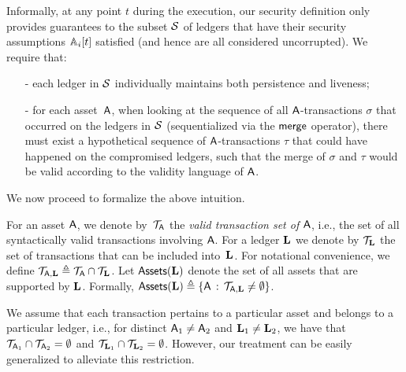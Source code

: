 Informally, at any point $t$ during the execution, our security definition only
provides guarantees to the  subset $\Secure$ of ledgers that have their security
assumptions $\Assum_i[t]$ satisfied (and hence are all considered uncorrupted). We
require that:
  \begin{itemize}
    \item[-] each ledger in $\Secure$ individually maintains both persistence and liveness;
    \item[-] for each asset~$\Asset$, when looking at the sequence of all
      $\Asset$-trans\-actions $\sigma$ that occurred on the ledgers in $\Secure$
      (sequentialized via the $\merge$ operator), there must exist a
      hypothetical sequence of $\Asset$-transactions $\tau$ that could have happened on the
      compromised ledgers, such that the merge of $\sigma$ and $\tau$ would be
      valid according to the validity language of $\Asset$.
  \end{itemize}
We now proceed to formalize the above intuition.

\begin{definition}
  For an asset $\Asset$, we denote by~$\Trans_{\Asset}$ the \emph{valid
  transaction set of $\Asset$}, i.e., the set of all syntactically
  valid transactions involving $\Asset$.
  For a ledger $\Ledger$ we denote by $\Trans_\Ledger$ the set of transactions
  that can be included into~$\Ledger$. For notational convenience, we define
  $\Trans_{\Asset,\Ledger}\defeq\Trans_{\Asset}\cap\Trans_\Ledger$.
  Let $\Assets(\Ledger)$  denote the set of all assets that are supported by
  $\Ledger$.
  Formally,
  $\Assets(\Ledger)
  \defeq
  \setd
    {\Asset}
    {\Trans_{\Asset,\Ledger}\neq\emptyset}$.
\end{definition}



We assume that each transaction pertains to a particular asset
and belongs to a particular ledger, i.e., for distinct
$\Asset_1\neq\Asset_2$ and
$\Ledger_1\neq\Ledger_2$, we have that
$\Trans_{\Asset_1}\cap\Trans_{\Asset_2}=\emptyset$ and
$\Trans_{\Ledger_1}\cap\Trans_{\Ledger_2}=\emptyset$.
However, our treatment can be easily generalized to alleviate this restriction.

